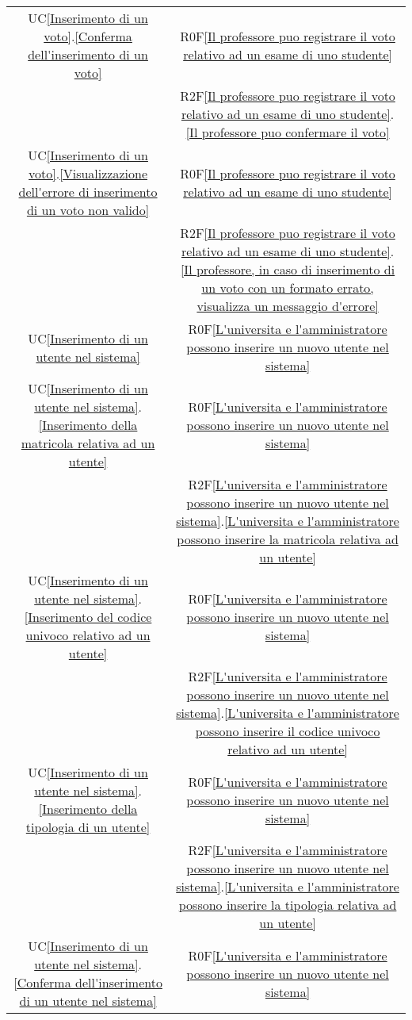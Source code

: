 \begin{longtable}{|c|c|}
\hline
UC\ref{Inserimento di un voto}.\ref{Conferma dell'inserimento di un voto} & R0F\ref{Il professore puo registrare il voto relativo ad un esame di uno studente}\\
& R2F\ref{Il professore puo registrare il voto relativo ad un esame di uno studente}.\ref{Il professore puo confermare il voto}\\
\hline
UC\ref{Inserimento di un voto}.\ref{Visualizzazione dell'errore di inserimento di un voto non valido} & R0F\ref{Il professore puo registrare il voto relativo ad un esame di uno studente}\\
& R2F\ref{Il professore puo registrare il voto relativo ad un esame di uno studente}.\ref{Il professore, in caso di inserimento di un voto con un formato errato, visualizza un messaggio d'errore}\\
\hline
UC\ref{Inserimento di un utente nel sistema} & R0F\ref{L'universita e l'amministratore possono inserire un nuovo utente nel sistema}\\
\hline
UC\ref{Inserimento di un utente nel sistema}.\ref{Inserimento della matricola relativa ad un utente} & R0F\ref{L'universita e l'amministratore possono inserire un nuovo utente nel sistema}\\
& R2F\ref{L'universita e l'amministratore possono inserire un nuovo utente nel sistema}.\ref{L'universita e l'amministratore possono inserire la matricola relativa ad un utente}\\
\hline
UC\ref{Inserimento di un utente nel sistema}.\ref{Inserimento del codice univoco relativo ad un utente} & R0F\ref{L'universita e l'amministratore possono inserire un nuovo utente nel sistema}\\
& R2F\ref{L'universita e l'amministratore possono inserire un nuovo utente nel sistema}.\ref{L'universita e l'amministratore possono inserire il codice univoco relativo ad un utente}\\
\hline
UC\ref{Inserimento di un utente nel sistema}.\ref{Inserimento della tipologia di un utente} & R0F\ref{L'universita e l'amministratore possono inserire un nuovo utente nel sistema}\\
& R2F\ref{L'universita e l'amministratore possono inserire un nuovo utente nel sistema}.\ref{L'universita e l'amministratore possono inserire la tipologia relativa ad un utente}\\
\hline
UC\ref{Inserimento di un utente nel sistema}.\ref{Conferma dell'inserimento di un utente nel sistema} & R0F\ref{L'universita e l'amministratore possono inserire un nuovo utente nel sistema}\\

\end{longtable}
